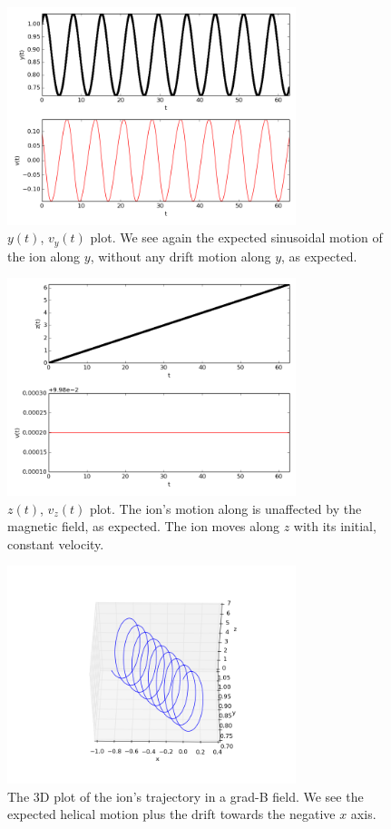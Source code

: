 \documentclass[11pt]{report}
\begin{document}
\begin{figure}[!ht]
  \centering
    \includegraphics[width=0.75\textwidth]{images/gradB_ion_y}
     \caption{$y(t)$, $v_y(t)$ plot. We see again the expected sinusoidal motion of the ion along $y$, without any drift motion along $y$, as expected.}
\end{figure}

\begin{figure}[!ht]
  \centering
    \includegraphics[width=0.75\textwidth]{images/gradB_ion_z}
     \caption{$z(t)$, $v_z(t)$ plot. The ion's motion along  is unaffected by the magnetic field, as expected. The ion moves along $z$ with its initial, constant velocity.}
\end{figure}

\begin{figure}[!ht]
  \centering
    \includegraphics[width=0.75\textwidth]{images/gradB_ion_3d}
     \caption{The 3D plot of the ion's trajectory in a grad-B field. We see the expected helical motion plus the drift towards the negative $x$ axis.}
\end{figure}
\end{document}

